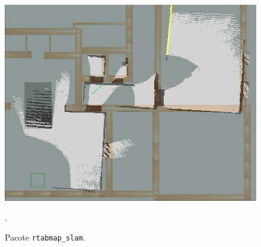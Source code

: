 \documentclass[repeatfields,xlists,xpacks,oneside,yearsonly]{ufrgscca}
\begin{document}

\begin{figure}[h]
        {
            \centering
            \caption{Pacote \texttt{rtabmap\_slam}.}
            \label{fig:mapping_rtabmap}
            \includegraphics[width=0.6\linewidth]{rtabmap_slam_map-compared.png}\\
        }
        {.}
\end{figure}
\end{document}
